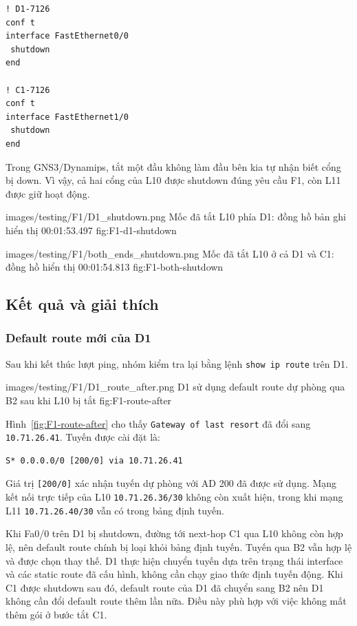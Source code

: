 \begin{lstlisting}
! D1-7126
conf t
interface FastEthernet0/0
 shutdown
end

! C1-7126
conf t
interface FastEthernet1/0
 shutdown
end
\end{lstlisting}

Trong GNS3/Dynamips, tắt một đầu không làm
đầu bên kia tự nhận biết cổng bị down.
Vì vậy, cả hai cổng của L10 được shutdown
đúng yêu cầu F1, còn L11 được giữ hoạt động.

\partzeroimage
{images/testing/F1/D1_shutdown.png}
{Mốc đã tắt L10 phía D1: đồng hồ bản ghi hiển thị 00:01:53.497}
{fig:F1-d1-shutdown}

\partzeroimage
{images/testing/F1/both_ends_shutdown.png}
{Mốc đã tắt L10 ở cả D1 và C1: đồng hồ hiển thị 00:01:54.813}
{fig:F1-both-shutdown}

\subsection{Kết quả và giải thích}

\subsubsection{Default route mới của D1}

Sau khi kết thúc lượt ping, nhóm kiểm tra lại
bằng lệnh \texttt{show ip route} trên D1.

\partzeroimage
{images/testing/F1/D1_route_after.png}
{D1 sử dụng default route dự phòng qua B2 sau khi L10 bị tắt}
{fig:F1-route-after}

Hình~\ref{fig:F1-route-after} cho thấy
\texttt{Gateway of last resort} đã đổi sang
\texttt{10.71.26.41}. Tuyến được cài đặt là:

\begin{lstlisting}
S* 0.0.0.0/0 [200/0] via 10.71.26.41
\end{lstlisting}

Giá trị \texttt{[200/0]} xác nhận tuyến dự phòng
với AD 200 đã được sử dụng.
Mạng kết nối trực tiếp của L10
\texttt{10.71.26.36/30} không còn xuất hiện,
trong khi mạng L11 \texttt{10.71.26.40/30}
vẫn có trong bảng định tuyến.

Khi Fa0/0 trên D1 bị shutdown,
đường tới next-hop C1 qua L10 không còn hợp lệ,
nên default route chính bị loại khỏi bảng định tuyến.
Tuyến qua B2 vẫn hợp lệ và được chọn thay thế.
D1 thực hiện chuyển tuyến dựa trên trạng thái interface
và các static route đã cấu hình, không cần chạy
giao thức định tuyến động.
Khi C1 được shutdown sau đó, default route của D1
đã chuyển sang B2 nên D1 không cần đổi default route thêm lần nữa.
Điều này phù hợp với việc không mất thêm gói ở bước tắt C1.

